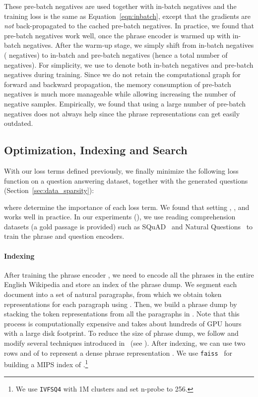 \documentclass[11pt,a4paper]{article}
\newcommand\ti[1]{\textit{#1}}
\begin{document}
These pre-batch negatives are used together with in-batch negatives and the training loss is the same as Equation~\eqref{eqn:inbatch}, except that the gradients are \ti{not} back-propagated to the cached pre-batch negatives.
In practice, we found that pre-batch negatives work well, once the phrase encoder is warmed up with in-batch negatives. After the warm-up stage, we simply shift from in-batch negatives ( negatives) to in-batch and pre-batch negatives (hence a total number of  negatives).
For simplicity, we use  to denote both in-batch negatives and pre-batch negatives during training.
Since we do not retain the computational graph for forward and backward propagation, the memory consumption of pre-batch negatives is much more manageable while allowing increasing the number of negative samples.
Empirically, we found that using a large number of pre-batch negatives does not always help since the phrase representations can get easily outdated.





\subsection{Optimization, Indexing and Search}\label{sec:optimization}
With our loss terms defined previously, we finally minimize the following loss function on a question answering dataset, together with the generated questions (Section~\ref{sec:data_sparsity}):

\noindent where  determine the importance of each loss term.
We found that setting , , and  works well in practice.
In our experiments (), we use reading comprehension datasets (a gold passage  is provided)  such as SQuAD~\cite{rajpurkar2016squad} and Natural Questions~\cite{kwiatkowski2019natural} to train the phrase and question encoders.




\paragraph{Indexing}
After training the phrase encoder , we need to encode all the phrases  in the entire English Wikipedia  and store an index of the phrase dump.
We segment each document  into a set of natural paragraphs, from which we obtain token representations for each paragraph using .
Then, we build a phrase dump  by stacking the token representations from all the paragraphs in .
Note that this process is computationally expensive and takes about hundreds of GPU hours with a large disk footprint.
To reduce the size of phrase dump, we follow and modify several techniques introduced in~\citet{seo2019real} (see ).
After indexing, we can use two rows  and  of  to represent a dense phrase representation .  We use \texttt{faiss}~\citep{johnson2017billion} for building a MIPS index of .\footnote{We use \texttt{IVFSQ4} with 1M clusters and set n-probe to 256.}
\end{document}

